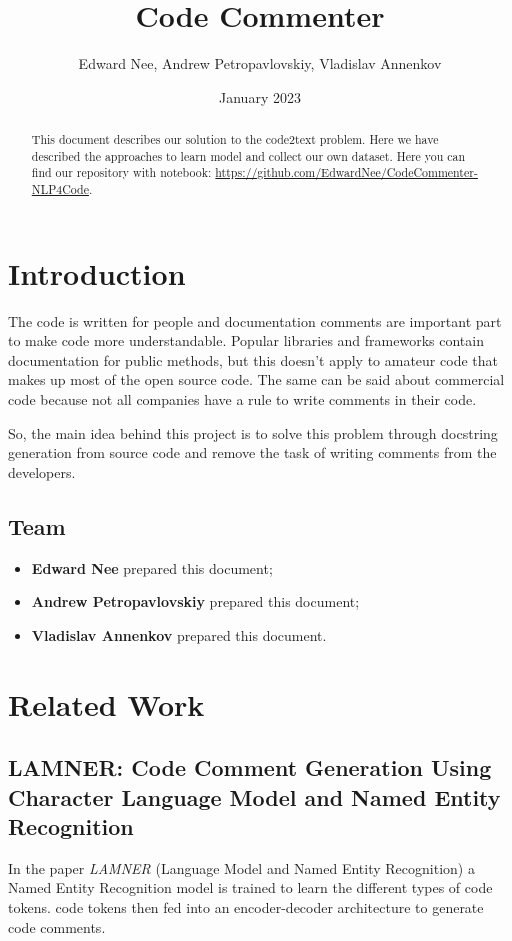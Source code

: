 \documentclass{article}
\title{Code Commenter}
\author{Edward Nee, Andrew Petropavlovskiy, Vladislav Annenkov}
\date{January 2023}
\begin{document}
\maketitle
\begin{abstract}
    This document describes our solution to the code2text problem. Here we have described the approaches to learn model and collect our own dataset. Here you can find our repository with notebook: \url{https://github.com/EdwardNee/CodeCommenter-NLP4Code}.
\end{abstract}



\section{Introduction}

The code is written for people and documentation comments are important part to make code more understandable. Popular libraries and frameworks contain documentation for public methods, but this doesn't apply to amateur code that makes up most of the open source code. The same can be said about commercial code because not all companies have a rule to write comments in their code.

So, the main idea behind this project is to solve this problem through docstring generation from source code and remove the task of writing comments from the developers.

\subsection{Team}

\begin{itemize}
  \item \textbf{Edward Nee} prepared this document;
  \item \textbf{Andrew Petropavlovskiy} prepared this document;
  \item \textbf{Vladislav Annenkov} prepared this document.
\end{itemize}



\section{Related Work}
\label{sec:related}

\subsection{LAMNER: Code Comment Generation Using Character Language Model and Named Entity Recognition}
In the paper \textit{LAMNER} \cite{lamnertoken} (Language Model and Named Entity Recognition) a Named Entity Recognition model is trained to learn the different types of code tokens. code tokens then fed into an encoder-decoder architecture to generate code comments.
\end{document}
